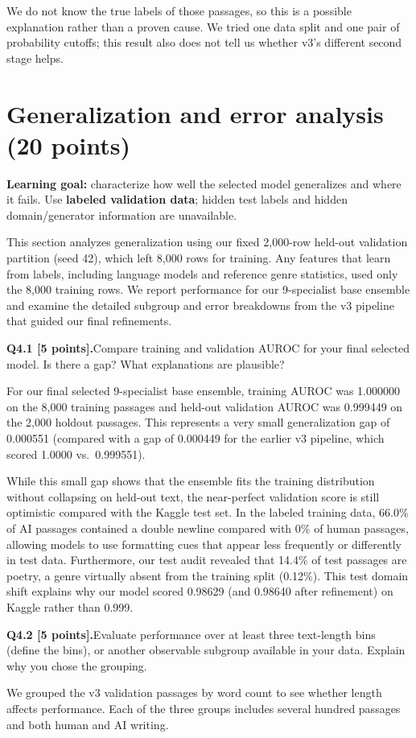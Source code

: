 \documentclass[11pt,letterpaper]{article}
\newcommand{\question}[2]{\needspace{4\baselineskip}\par\addvspace{0.45em}\noindent\textbf{#1}\quad #2\par\nobreak\vspace{0.1em}}
\begin{document}
We do not know the true labels of those passages, so this is a possible explanation rather than a proven cause. We tried one data split and one pair of probability cutoffs; this result also does not tell us whether v3's different second stage helps.
\newpage
\section{Generalization and error analysis (20 points)}
\textbf{Learning goal:} characterize how well the selected model generalizes and where it fails. Use \textbf{labeled validation data}; hidden test labels and hidden domain/generator information are unavailable.

This section analyzes generalization using our fixed 2,000-row held-out validation partition (seed 42), which left 8,000 rows for training. Any features that learn from labels, including language models and reference genre statistics, used only the 8,000 training rows. We report performance for our 9-specialist base ensemble and examine the detailed subgroup and error breakdowns from the v3 pipeline that guided our final refinements.

\question{Q4.1 [5 points].}{Compare training and validation AUROC for your final selected model. Is there a gap? What explanations are plausible?}
For our final selected 9-specialist base ensemble, training AUROC was 1.000000 on the 8,000 training passages and held-out validation AUROC was 0.999449 on the 2,000 holdout passages. This represents a very small generalization gap of 0.000551 (compared with a gap of 0.000449 for the earlier v3 pipeline, which scored 1.0000 vs.\ 0.999551).

While this small gap shows that the ensemble fits the training distribution without collapsing on held-out text, the near-perfect validation score is still optimistic compared with the Kaggle test set. In the labeled training data, 66.0\% of AI passages contained a double newline compared with 0\% of human passages, allowing models to use formatting cues that appear less frequently or differently in test data. Furthermore, our test audit revealed that 14.4\% of test passages are poetry, a genre virtually absent from the training split (0.12\%). This test domain shift explains why our model scored 0.98629 (and 0.98640 after refinement) on Kaggle rather than 0.999.
\question{Q4.2 [5 points].}{Evaluate performance over at least three text-length bins (define the bins), or another observable subgroup available in your data. Explain why you chose the grouping.}
We grouped the v3 validation passages by word count to see whether length affects performance. Each of the three groups includes several hundred passages and both human and AI writing.
\end{document}
